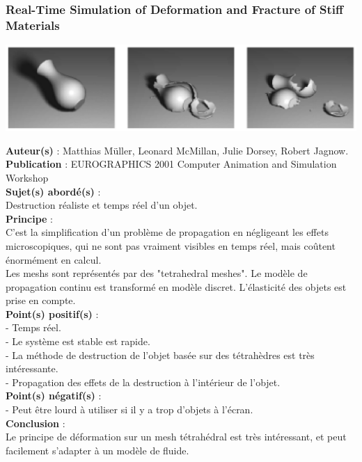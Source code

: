 \documentclass[a4paper,10pt]{article}
\begin{document}
\subsubsection{Real-Time Simulation of Deformation and Fracture of Stiff Materials}
    \begin{center}
	\includegraphics[scale=0.8]{Deformation.ps}
    \end{center}
\textbf{Auteur(s)} : Matthias Müller, Leonard McMillan, Julie Dorsey, Robert Jagnow.\\
\textbf{Publication} : EUROGRAPHICS 2001 Computer Animation and Simulation Workshop \\
\textbf{Sujet(s) abordé(s)} : \\
	Destruction réaliste et temps réel d'un objet. \\
\textbf{Principe} :\\	
	C'est la simplification d'un problème de propagation en négligeant les effets microscopiques, qui ne sont pas vraiment visibles en temps réel, mais coûtent énormément en calcul.\\
	Les meshs sont représentés par des "tetrahedral meshes". Le modèle de propagation continu est transformé en modèle discret. L'élasticité des objets est prise en compte.\\
\textbf{Point(s) positif(s)} :\\
	- Temps réel.\\
	- Le système est stable est rapide.\\
	- La méthode de destruction de l'objet basée sur des tétrahèdres est très intéressante.\\
	- Propagation des effets de la destruction à l'intérieur de l'objet.\\
\textbf{Point(s) négatif(s)} :\\
	- Peut être lourd à utiliser si il y a trop d'objets à l'écran.\\
\textbf{Conclusion} :\\
	Le principe de déformation sur un mesh tétrahédral est très intéressant, et peut facilement s'adapter à un modèle de fluide.
\end{document}
